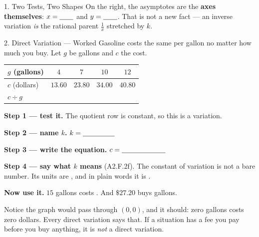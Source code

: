 \documentclass[10pt]{article}
\begin{document}
\begin{notesbox}{1. Two Tests, Two Shapes}
\vspace{3pt}
On the right, the asymptotes are the \textbf{axes themselves}: $x=\blank{0.7cm}$ and
$y=\blank{0.7cm}$. That is not a new fact --- an inverse variation \emph{is} the rational parent
$\frac1x$ stretched by $k$.

\vspace{3pt}
\begin{center}
\end{center}
\end{notesbox}

\begin{notesbox}{2. Direct Variation --- Worked}
Gasoline costs the same per gallon no matter how much you buy. Let $g$ be gallons and $c$ the cost.
\begin{center}
\renewcommand{\arraystretch}{1.35}
\begin{tabular}{|l|c|c|c|c|}
\hline
\rowcolor{forestbg}
$g$ (gallons) & $4$ & $7$ & $10$ & $12$ \\ \hline
$c$ (dollars) & $13.60$ & $23.80$ & $34.00$ & $40.80$ \\ \hline
$c\div g$ & & & & \\ \hline
\end{tabular}
\end{center}
\vspace{-2pt}
\textbf{Step 1 --- test it.} The quotient row is constant, so this is a \blank{2.4cm} variation.

\textbf{Step 2 --- name $k$.} $k=\blank{1.6cm}$

\textbf{Step 3 --- write the equation.} $c=\blank{2.2cm}$

\textbf{Step 4 --- say what $k$ means} (A2.F.2f). The constant of variation is not a bare number. Its
units are \blank{4.0cm}, and in plain words it is \blank{5.0cm}.

\vspace{3pt}
\textbf{Now use it.} $15$ gallons costs \blank{2.0cm}. \; And $\$27.20$ buys \blank{2.0cm} gallons.

\vspace{3pt}
{\small Notice the graph would pass through $(0,0)$, and it should: zero gallons costs zero dollars.
Every direct variation says that. If a situation has a fee you pay before you buy anything, it is
\emph{not} a direct variation.}
\end{notesbox}
\end{document}
